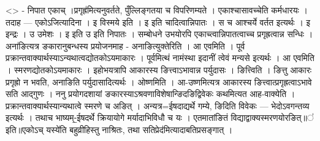 \textless{}\textgreater{} - निपात एकाच् ।प्रगृह्र॑मित्यनुवर्तते,
पुँल्लिङ्गतया च विपरिणम्यते । एकाश्चासावच्चेति कर्मधारयः । तदाह ---
एकोऽजित्यादिना । इ विस्मये इति । इ इति चादित्वान्निपातः । स च आश्चर्ये
वर्तत इत्यर्थः । इ इन्द्रः । उ उमेशः । इ इति उ इति निपातः । सम्बोधने
उभयोरपि एकाच्त्वान्निपातत्वाच्च प्रगृह्रत्वान्न सन्धिः ।अना॑ङित्यत्र
ङकारानुबन्धस्य प्रयोजनमाह - अनाङित्युक्तेरिति । आ एवमिति । पूर्व
प्रक्रान्तवाक्यार्थस्याऽन्यथात्वद्योतकोऽयमाकारः । पूर्वमित्थं नामंस्था
इदानीं त्वेवं मन्यसे इत्यर्थः । आ एवमिति । स्मरणद्योतकोऽयमाकारः ।
इहोभयत्रापि आकारस्य ङित्त्वाऽभावान्न पर्युदासः । ङित्त्विति । ङित्तु
आकारः प्रगृह्रो न भवति, अनाङिति पर्युदासादित्यर्थः । ओष्णमिति ।
आ-उष्णमित्यत्र आकारस्य ङित्त्वात्प्रगृह्रत्वाऽभावे सति आद्गुणः । ननु
प्रयोगदशायां ङकारस्याऽश्रवणाविशेषान्ङिदङिद्विवेकः कथमित्यत आह-वाक्येति ।
प्रक्रान्तवाक्यार्थस्यान्यथात्वे स्मरणे च अङित् । अन्यत्र=ईषदाद्यर्थे
गम्ये, ङिदिति विवेकः --- भेदोऽवगन्तव्य इत्यर्थः । तथाच भाष्यम्-॒ईषदर्थे
क्रियायोगे मर्यादाभिविधौ च यः । एतमातांङितं विद्याद्वाक्यस्मरणयोरङित्॥॑
इति॥एकोऽच् यस्ये॑ति बहुव्रीहिस्तु नाश्रितः, तथा
सतिप्रेद॑मित्यादाबतिप्रसङ्गात् ।

